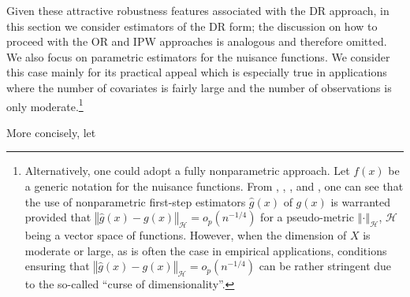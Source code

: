 \documentclass[11pt]{article}%
\theoremstyle{plain}
\numberwithin{sassumption}{section}
\numberwithin{equation}{section}
\begin{document}
Given these attractive robustness features associated with the DR approach, in
this section we consider estimators of the DR form; the discussion on how to
proceed with the OR and IPW approaches is analogous and therefore omitted. We
also focus on parametric estimators for the nuisance functions.  We consider this case mainly for its practical appeal which is especially true in applications where the number of covariates is fairly large and the number of observations is only moderate.\footnote{Alternatively, one could adopt a fully nonparametric approach. Let $f\left( x\right) $ be a generic notation for the nuisance functions. From \cite{Newey1994}, \cite{Chen2003}, \cite{Ai2003, Ai2007,
		Ai2012}, and \cite{Chen2008}, one can see that the use of nonparametric
	first-step estimators $\widehat{g}\left( x\right) $ of $g\left( x\right) $
	is warranted provided that $\left\Vert \widehat{g}\left( x\right) -g\left(
	x\right) \right\Vert _{\mathcal{H}}=o_{p}\left( n^{-1/4}\right) $ for a
	pseudo-metric $\left\Vert \cdot \right\Vert _{\mathcal{H}}$, $\mathcal{H}$
	being a vector space of functions. However, when the dimension of $X$ is
	moderate or large, as is often the case in empirical applications,
	conditions ensuring that $\left\Vert \widehat{g}\left( x\right) -g\left(
	x\right) \right\Vert _{\mathcal{H}}=o_{p}\left( n^{-1/4}\right) $ can be
	rather stringent due to the so-called ``curse of dimensionality''.}

More concisely, let%
\end{document}
